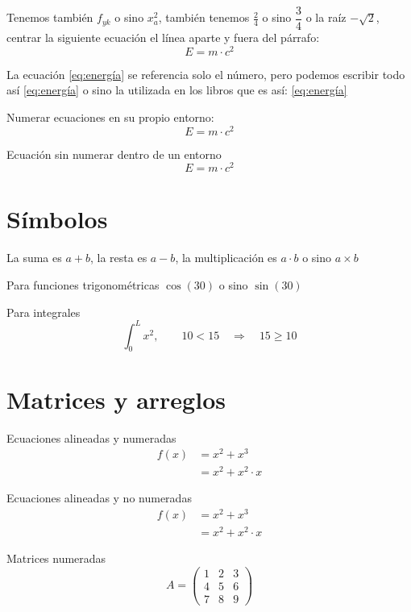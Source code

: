 \documentclass[a4paper, 12pt]{article}
\begin{document}
	Tenemos también $ f_{yk} $ o sino $ x_{a}^{2} $, también tenemos $ \frac{2}{4} $ o sino $ \dfrac{3}{4} $ o la raíz $-\sqrt{2}$, centrar la siguiente ecuación el línea aparte y fuera del párrafo: $$E = m \cdot c^2 $$
	
	La ecuación \ref{eq:energía} se referencia solo el número, pero podemos escribir todo así \autoref{eq:energía} o sino la utilizada en los libros que es así: \eqref{eq:energía}
	
	Numerar ecuaciones en su propio entorno:
	\begin{equation} \label{eq:energía}
		E = m \cdot c^2
	\end{equation}
	
	Ecuación sin numerar dentro de un entorno
	\begin{equation*}
		E = m \cdot c^2
	\end{equation*}
	
	
	\section{Símbolos}
	La suma es $ a + b $, la resta es $ a - b $, la multiplicación es $ a \cdot b$ o sino $ a \times b $
	
	Para funciones trigonométricas $ \cos(30) $ o sino $ \sin(30) $
	
	Para integrales $$ \int_0^L x^2, \quad \quad 10 < 15 \quad \Rightarrow \quad 15 \geq 10 $$ %
	
	\section{Matrices y arreglos}
	
	Ecuaciones alineadas y numeradas
	\begin{align}
		f(x) & = x^2 + x^3 \\
		& = x^2 + x^2 \cdot x
	\end{align}
	
	Ecuaciones alineadas y no numeradas
	\begin{align*}
		f(x) & = x^2 + x^3 \\
		& = x^2 + x^2 \cdot x
	\end{align*}
	
	Matrices numeradas
	\begin{equation}
		A = 
		\begin{pmatrix}
			1 & 2 & 3 \\
			4 & 5 & 6 \\
			7 & 8 & 9
		\end{pmatrix}
	\end{equation}
	
\end{document}
